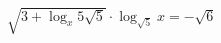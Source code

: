 \begin{ex}[type=equation]
	\begin{condition}
		$\sqrt{3 + \log_x 5\sqrt{5}}\cdot\log_{\sqrt{5}} x = -\sqrt{6}$
	\end{condition}
\end{ex}